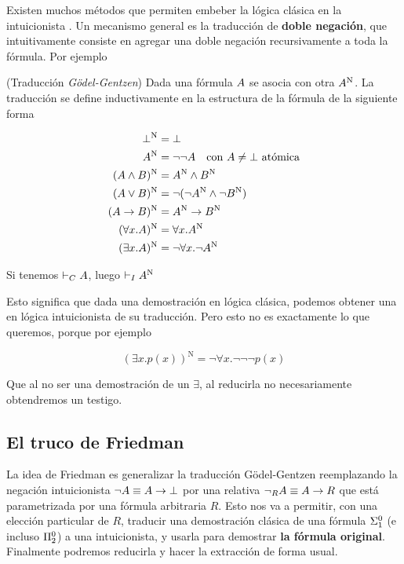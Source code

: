 Existen muchos métodos que permiten embeber la lógica clásica en la
intuicionista . Un mecanismo general es la traducción de
\textbf{doble negación}, que intuitivamente consiste en agregar una doble
negación recursivamente a toda la fórmula. Por ejemplo

\newcommand{\gN}[1]{#1^{\text{N}}}

\begin{definition}{(Traducción \textit{Gödel-Gentzen})} Dada una fórmula $A$ se asocia con otra $\gN{\form}$. La
    traducción se define inductivamente en la estructura de la fórmula de la
    siguiente forma

    \begin{align*}
        \gN{\bot} &= \bot\\
        \gN{\form} &= \neg\neg \form \quad \text{con $\form \neq \bot$ atómica}\\
        \gN{(\form \wedge \formTwo)} &= \gN{\form} \wedge \gN{\formTwo}\\
        \gN{(\form \vee \formTwo)} &= \neg(\neg\gN{\form} \wedge \neg\gN{\formTwo})\\
        \gN{(\form \rightarrow \formTwo)} &= \gN{\form} \rightarrow \gN{\formTwo}\\
        \gN{(\forall \var . \form)} &= \forall \var . \gN{\form}\\
        \gN{(\exists \var . \form)} &= \neg \forall \var . \neg \gN{\form}
    \end{align*}
\end{definition}

\begin{theorem}
    Si tenemos $\vdash_C A$, luego $\judgI \gN{\form}$
\end{theorem}

Esto significa que dada una demostración en lógica clásica, podemos obtener una
en lógica intuicionista de su traducción. Pero esto no es exactamente lo que
queremos, porque por ejemplo

\[
    \gN{(\exists x. p(x))} = \neg \forall x . \neg\neg\neg p(x)
\]

Que al no ser una demostración de un $\exists$, al reducirla no necesariamente
obtendremos un testigo.

\subsection{El truco de Friedman}

La idea de Friedman \cite{miquel-friedman} es generalizar la traducción
Gödel-Gentzen reemplazando la negación intuicionista $\neg A \equiv A
\rightarrow \bot$ por una relativa $\neg_R A \equiv A \rightarrow R$ que
está parametrizada por una fórmula arbitraria $R$. Esto nos va a permitir, con
una elección particular de $R$,
traducir una demostración clásica de una fórmula $\Sigma^0_1$ (e incluso
$\Pi^0_2$) a una intuicionista, y usarla para demostrar \textbf{la fórmula
original}. Finalmente podremos reducirla y hacer la extracción de forma usual.

